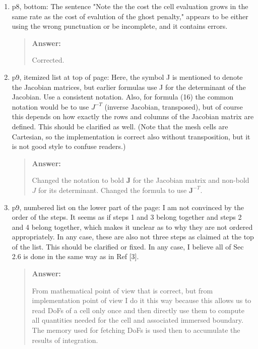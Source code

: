 \documentclass[11pt, a4paper]{article}
\newenvironment{answer}{%
      \begin{quote}%
            \color{blue!80!black}%
            \textbf{Answer:}%
            }{%
      \end{quote}%
}
\begin{document}
\begin{enumerate}[label=\textbullet, wide, labelindent=0pt]
      \item p8, bottom: The sentence "Note the the cost the cell evaluation grows in the same rate as the cost of
            evalution of the ghost penalty," appears to be either using the wrong punctuation or be incomplete, and it
            contains
            errors.
            \begin{answer}
                  Corrected.
            \end{answer}

      \item p9, itemized list at top of page: Here, the symbol J is mentioned to denote the Jacobian matrices, but
            earlier formulas use J for the determinant of the Jacobian. Use a consistent notation. Also, for formula
            (16)
            the
            common notation would be to use \(J^{-T}\) (inverse Jacobian, transposed), but of course this depends on
            how
            exactly
            the rows and columns of the Jacobian matrix are defined. This should be clarified as well. (Note that the
            mesh cells
            are Cartesian, so the implementation is correct also without transposition, but it is not good style to
            confuse
            readers.)
            \begin{answer}
                  Changed the notation to bold $\bm{J}$ for the Jacobian matrix and non-bold $J$ for its determinant.
                  Changed the formula to use \(\bm{J}^{-T}\).
            \end{answer}

      \item p9, numbered list on the lower part of the page: I am not convinced by the order of the steps. It seems
            as if steps 1 and 3 belong together and steps 2 and 4 belong together, which makes it unclear as to why
            they
            are not
            ordered appropriately. In any case, these are also not three steps as claimed at the top of the list. This
            should be
            clarified or fixed. In any case, I believe all of Sec 2.6 is done in the same way as in Ref [3].
            \begin{answer}
                  From mathematical point of view that is correct, but from implementation point of view I do it this
                  way because this allows us to read DoFs of a cell only once and then directly use them to compute all
                  quantities needed
                  for the cell and associated immersed boundary. The memory used for fetching DoFs is used then to
                  accumulate the results of integration.


\end{answer}
\end{enumerate}
\end{document}
